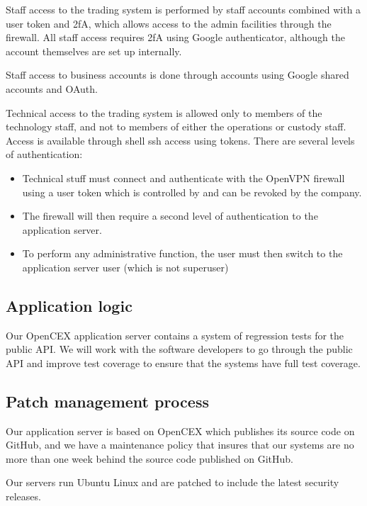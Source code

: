 Staff access to the trading system is performed by staff accounts
combined with a user token and 2fA, which allows access to the admin
facilities through the firewall.  All staff access requires 2fA using
Google authenticator, although the account themselves are set up
internally.

Staff access to business accounts is done through accounts using
Google shared accounts and OAuth.

Technical access to the trading system is allowed only to members of
the technology staff, and not to members of either the operations or
custody staff.  Access is available through shell ssh access using
tokens.  There are several levels of authentication:

\begin{itemize}
\item Technical stuff must connect and authenticate with the OpenVPN
firewall using a user token which is controlled by and can be revoked
by the company.
\item The firewall will then require a second level of authentication to
the application server.
\item To perform any administrative function, the user must then switch
  to the application server user (which is not superuser)
\end{itemize}


\subsection{Application logic}
Our OpenCEX application server contains a system of regression tests for the
public API.  We will work with the software developers to go through
the public API and improve test coverage to ensure that the systems
have full test coverage.

\subsection{Patch management process}

Our application server is based on OpenCEX which publishes its
source code on GitHub, and we have a maintenance policy that insures
that our systems are no more than one week behind the source code
published on GitHub.

Our servers run Ubuntu Linux and are patched to include the latest
security releases.

